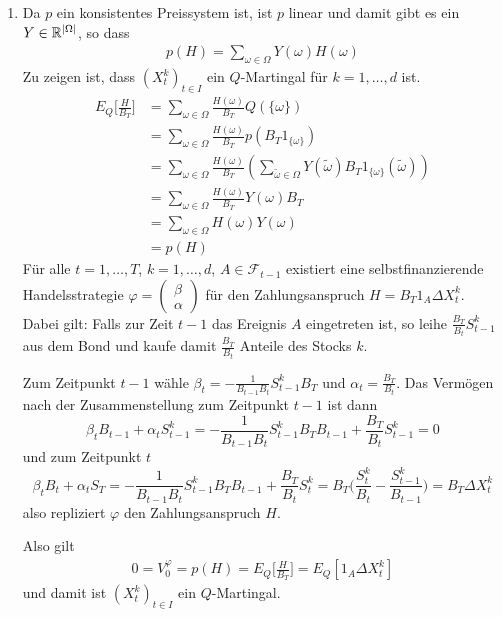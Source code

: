 \documentclass[a4paper,twoside,DIV15,BCOR12mm]{scrbook}
\newcommand{\cF}{\mathcal F}
\begin{document}
\begin{beweis}
\begin{enumerate}
\item Da $p$ ein konsistentes Preissystem ist, ist $p$ linear und damit gibt es ein $Y\in\mathbb{R}^{|\Omega|}$, so dass
\begin{align*}
p(H) = \sum_{\omega\in\Omega} Y(\omega)H(\omega) \tag{$*$}
\end{align*}
Zu zeigen ist, dass $(X_t^k)_{t\in I}$ ein $Q$-Martingal für $k=1,\ldots,d$ ist.
\begin{align*}
E_Q\bigg[\frac H{B_T}\bigg] &= 
\sum_{\omega\in \Omega} \frac{H(\omega)}{B_T} Q(\{\omega\}) \\
&= \sum_{\omega\in \Omega} \frac{H(\omega)}{B_T} p(B_T 1_{\{\omega\}}) \\
&= \sum_{\omega\in \Omega} \frac{H(\omega)}{B_T} (\sum_{\tilde\omega\in\Omega} Y(\tilde\omega)  B_T 1_{\{\omega\}}(\tilde\omega))\\
&= \sum_{\omega\in \Omega} \frac{H(\omega)}{B_T}  Y(\omega) B_T \\
&= \sum_{\omega\in \Omega} H(\omega)Y(\omega) \\
&= p(H)
\end{align*}
Für alle $t=1,\ldots,T$, $k=1,\ldots,d$, $A\in \cF_{t-1}$ existiert eine selbstfinanzierende Handelsstrategie
$\varphi=\left(\begin{smallmatrix} \beta \\ \alpha \end{smallmatrix}\right)$
für den Zahlungsanspruch $H=B_T 1_A\Delta X_t^k$. Dabei gilt: Falls zur Zeit $t-1$ das Ereignis $A$ eingetreten ist, so leihe $\frac{B_T}{B_t} S_{t-1}^k$ aus dem Bond und kaufe damit $\frac{B_T}{B_t}$ Anteile des Stocks $k$.

Zum Zeitpunkt $t-1$ wähle $\beta_t = -\frac 1{B_{t-1}B_t} S_{t-1}^k B_T$ und $\alpha_t = \frac{B_T}{B_t}$. Das Vermögen nach der Zusammenstellung zum Zeitpunkt $t-1$ ist dann 
\[\beta_tB_{t-1}+ \alpha_tS_{t-1}^k = -\frac1{B_{t-1}B_t} S_{t-1}^k B_T B_{t-1} + \frac{B_T}{B_t} S_{t-1}^k = 0\]
und zum Zeitpunkt $t$
\[
\beta_t B_t + \alpha_t S_T = - \frac 1{B_{t-1} B_t} S_{t-1}^k B_T B_{t-1} + \frac{B_T}{B_t} S_t^k = B_T\bigg(\frac{S_t^k}{B_t} - \frac{S_{t-1}^k}{B_{t-1}}\bigg) = B_T\Delta X_t^k
\]
also repliziert $\varphi$ den Zahlungsanspruch $H$.

Also gilt 
\begin{align*}
0=V_0^\varphi = p(H) = E_Q\bigg[\frac H{B_T}\bigg] =  E_Q[1_A \Delta X_t^k]
\end{align*}
und damit ist $(X_t^k)_{t\in I}$ ein $Q$-Martingal.


\end{enumerate}
\end{beweis}
\end{document}
